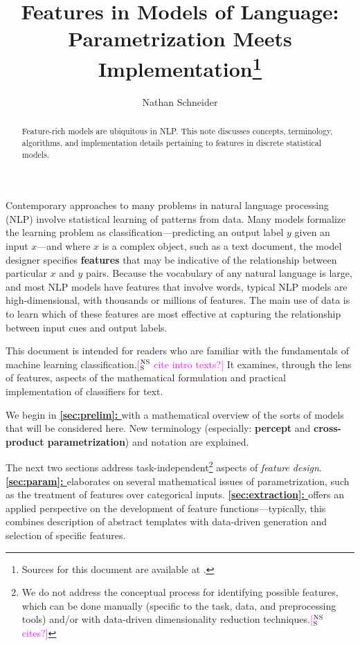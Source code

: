 \documentclass[11pt,letterpaper]{article}
\title{\draftnotice{{\it\small WORKING DRAFT}\\[5pt] }Features in Models of Language:\\ Parametrization Meets Implementation\thanks{Sources for this document are available at \textsmaller{\url{https://github.com/nschneid/features-note}}.}}
\author{Nathan Schneider\\ \textsmaller{\texttt{\href{mailto:nschneid@cs.cmu.edu}{nschneid@cs.cmu.edu}}}}
\date{}
\newcommand{\ensuretext}[1]{#1}
\newcommand{\nssmarker}{\ensuretext{\textcolor{magenta}{\ensuremath{^{\textsc{NS}}_{\textsc{S}}}}}}
\newcommand{\arkcomment}[3]{\ensuretext{\textcolor{#3}{[#1 #2]}}}
\newcommand{\nss}[1]{\arkcomment{\nssmarker}{#1}{magenta}}
\newcommand*{\fullref}[1]{\hyperref[{#1}]{\cref*{#1}: \nameref{#1}}}
\begin{document}
\maketitle
\begin{abstract}
\noindent Feature-rich models are ubiquitous in NLP. 
This note discusses concepts, terminology, algorithms, and implementation details pertaining to features in discrete statistical models.
\end{abstract}

Contemporary approaches to many problems in natural language processing (NLP)
involve statistical learning of patterns from data. 
Many models formalize the learning problem as classification---predicting an output label $y$ 
given an input $x$---and where $x$ is a complex object, such as a text document,
the model designer specifies \textbf{features} that may be indicative of the relationship between 
particular $x$ and $y$ pairs. 
Because the vocabulary of any natural language is large, and most NLP models have features that involve words, 
typical NLP models are high-dimensional, with thousands or millions of features.
The main use of data is to learn which of these features are most effective 
at capturing the relationship between input cues and output labels.

This document is intended for readers who are familiar with the fundamentals of 
machine learning classification.\nss{cite intro texts?} 
It examines, through the lens of features, aspects of
the mathematical formulation and practical implementation of classifiers for text.

We begin in {\bf \fullref{sec:prelim}} with a mathematical overview of the sorts of models 
that will be considered here.
New terminology (especially: \textbf{percept} and \textbf{cross-product parametrization})
and notation are explained.

The next two sections address task-independent\footnote{We do not address the conceptual process for identifying 
possible features, which can be done manually (specific to the task, data, and preprocessing tools) 
and/or with data-driven dimensionality reduction techniques.\nss{cites?}} aspects of {\em feature design}.
{\bf \fullref{sec:param}} elaborates on several mathematical issues of parametrization, 
such as the treatment of features over categorical inputs.
{\bf \fullref{sec:extraction}} offers an applied perspective on the development of feature functions---typically, 
this combines description of abstract templates with data-driven generation and selection of specific features.
\end{document}
